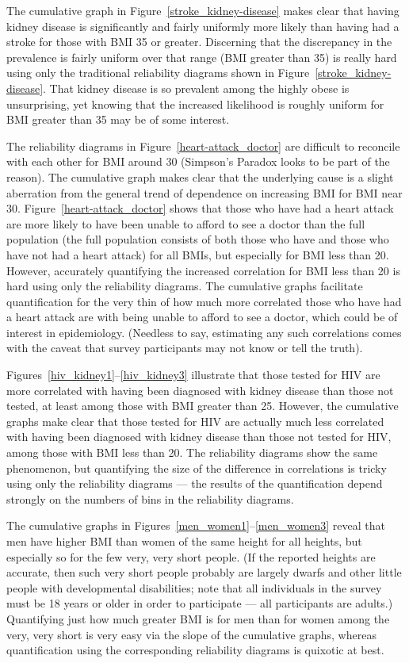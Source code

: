 \documentclass[]{fairmeta}
\begin{document}
The cumulative graph in Figure~\ref{stroke_kidney-disease} makes clear that
having kidney disease is significantly and fairly uniformly more likely
than having had a stroke for those with BMI 35 or greater.
Discerning that the discrepancy in the prevalence is fairly uniform
over that range (BMI greater than 35) is really hard
using only the traditional reliability diagrams shown
in Figure~\ref{stroke_kidney-disease}.
That kidney disease is so prevalent among the highly obese is unsurprising,
yet knowing that the increased likelihood is roughly uniform
for BMI greater than 35 may be of some interest.

The reliability diagrams in Figure~\ref{heart-attack_doctor}
are difficult to reconcile with each other for BMI around 30
(Simpson's Paradox looks to be part of the reason).
The cumulative graph makes clear that the underlying cause
is a slight aberration from the general trend of dependence on increasing BMI
for BMI near 30. Figure~\ref{heart-attack_doctor} shows that those who have had
a heart attack are more likely to have been unable to afford to see a doctor
than the full population (the full population consists of both those who have
and those who have not had a heart attack) for all BMIs, but especially
for BMI less than 20. However, accurately quantifying the increased correlation
for BMI less than 20 is hard using only the reliability diagrams.
The cumulative graphs facilitate quantification for the very thin
of how much more correlated those who have had a heart attack are
with being unable to afford to see a doctor, which could be of interest
in epidemiology. (Needless to say, estimating any such correlations comes
with the caveat that survey participants may not know or tell the truth).

Figures~\ref{hiv_kidney1}--\ref{hiv_kidney3} illustrate that those tested
for HIV are more correlated with having been diagnosed with kidney disease
than those not tested, at least among those with BMI greater than 25.
However, the cumulative graphs make clear that those tested for HIV are
actually much less correlated with having been diagnosed with kidney disease
than those not tested for HIV, among those with BMI less than 20.
The reliability diagrams show the same phenomenon, but quantifying
the size of the difference in correlations is tricky using only
the reliability diagrams --- the results of the quantification depend strongly
on the numbers of bins in the reliability diagrams.

The cumulative graphs in Figures~\ref{men_women1}--\ref{men_women3}
reveal that men have higher BMI than women of the same height for all heights,
but especially so for the few very, very short people.
(If the reported heights are accurate, then such very short people probably
are largely dwarfs and other little people with developmental disabilities;
note that all individuals in the survey must be 18 years or older
in order to participate --- all participants are adults.)
Quantifying just how much greater BMI is for men than for women
among the very, very short is very easy via the slope of the cumulative graphs,
whereas quantification using the corresponding reliability diagrams
is quixotic at best.
\end{document}
